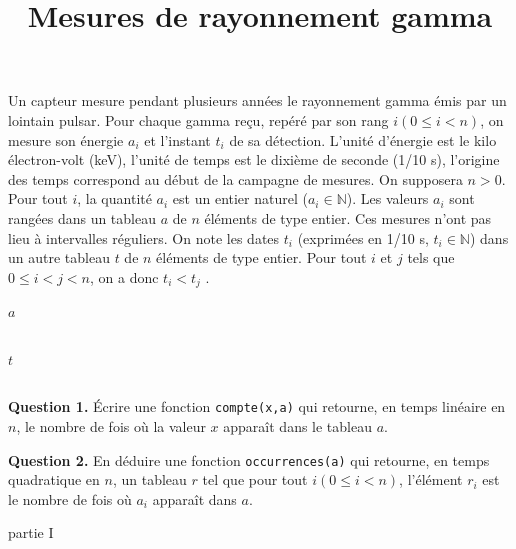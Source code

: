 \documentclass[11pt,a4paper]{article}
\title{Mesures de rayonnement gamma}
\date{}
\begin{document}
\maketitle
\thispagestyle{fancy}

Un capteur mesure pendant plusieurs années le rayonnement gamma émis par un lointain pulsar.
Pour chaque gamma reçu, repéré par son rang $i (0 \le i < n)$, on mesure son énergie $a_i$ et l’instant $t_i$ de sa détection.
L’unité d’énergie est le kilo électron-volt (keV), l’unité de temps est le dixième de seconde (1/10 s), l’origine des temps correspond au début de la campagne de mesures.
On supposera $n > 0$.
Pour tout $i$, la quantité $a_i$ est un entier naturel ($a_i \in \mathbb{N}$).
Les valeurs $a_i$ sont rangées dans un tableau $a$ de $n$ éléments de type entier. Ces mesures n’ont pas lieu à intervalles réguliers.
On note les dates $t_i$ (exprimées en 1/10 s, $t_i \in \mathbb{N}$) dans un autre tableau $t$ de $n$ éléments de type entier.
Pour tout $i$ et $j$ tels que $0 \le i < j < n$, on a donc $t_i < t_j$ .

\begin{center}
$a$
\begin{tabular}{|c|c|c|c|c|c|c|c|c|c|c|c|c|c|c|c|c|c|c|c|}
\hline
&&&&&&&&&&&&&&&&&&&\\
\hline
\end{tabular}

$t$
\begin{tabular}{|c|c|c|c|c|c|c|c|c|c|c|c|c|c|c|c|c|c|c|c|}
\hline
&&&&&&&&&&&&&&&&&&&\\
\hline
\end{tabular}
\end{center}

\bigskip

\textbf{Question 1.} Écrire une fonction \texttt{compte(x,a)} qui retourne, en temps linéaire en $n$, le nombre de fois où la valeur $x$ apparaît dans le tableau $a$.

\bigskip

\textbf{Question 2.} En déduire une fonction \texttt{occurrences(a)} qui retourne, en temps quadratique en $n$, un tableau $r$ tel que pour tout $i (0 \le i < n)$, l’élément $r_i$ est le nombre de fois où $a_i$ apparaît dans $a$.

\bigskip

\begin{center}
\huge{partie I}
\end{center}

\bigskip
\end{document}
